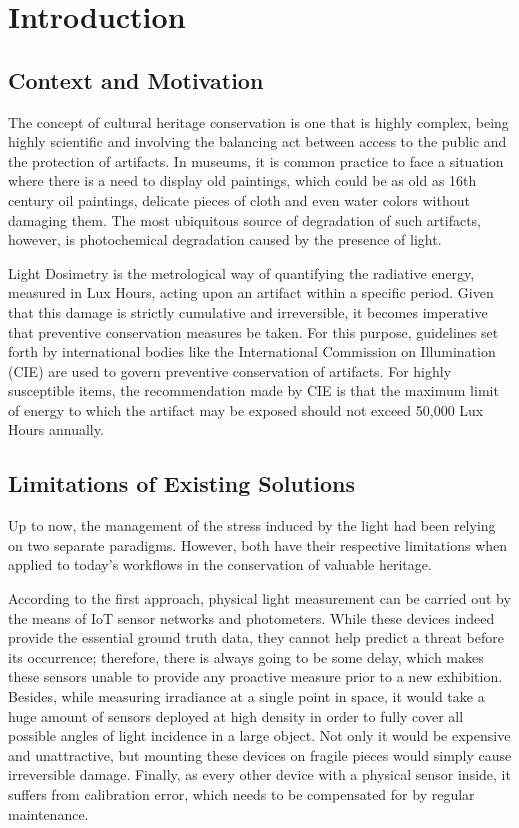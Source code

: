 \chapter{Introduction}\label{ch:context}
\pagestyle{fancy}

\section{Context and Motivation}
The concept of cultural heritage conservation is one that is highly complex, being highly scientific and involving the balancing act between access to the public and the protection of artifacts. In museums, it is common practice to face a situation where there is a need to display old paintings, which could be as old as 16th century oil paintings, delicate pieces of cloth and even water colors without damaging them. The most ubiquitous source of degradation of such artifacts, however, is photochemical degradation caused by the presence of light.

Light Dosimetry is the metrological way of quantifying the radiative energy, measured in Lux Hours, acting upon an artifact within a specific period. Given that this damage is strictly cumulative and irreversible, it becomes imperative that preventive conservation measures be taken. For this purpose, guidelines set forth by international bodies like the International Commission on Illumination (CIE) are used to govern preventive conservation of artifacts. For highly susceptible items, the recommendation made by CIE is that the maximum limit of energy to which the artifact may be exposed should not exceed 50,000 Lux Hours annually.

\section{Limitations of Existing Solutions}
Up to now, the management of the stress induced by the light had been relying on two separate paradigms. However, both have their respective limitations when applied to today's workflows in the conservation of valuable heritage.

According to the first approach, physical light measurement can be carried out by the means of IoT sensor networks and photometers. While these devices indeed provide the essential ground truth data, they cannot help predict a threat before its occurrence; therefore, there is always going to be some delay, which makes these sensors unable to provide any proactive measure prior to a new exhibition. Besides, while measuring irradiance at a single point in space, it would take a huge amount of sensors deployed at high density in order to fully cover all possible angles of light incidence in a large object. Not only it would be expensive and unattractive, but mounting these devices on fragile pieces would simply cause irreversible damage. Finally, as every other device with a physical sensor inside, it suffers from calibration error, which needs to be compensated for by regular maintenance.

